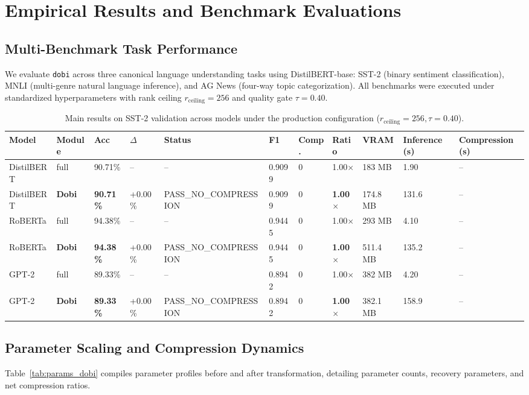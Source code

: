 \section{Empirical Results and Benchmark Evaluations}
\label{sec:results}

\subsection{Multi-Benchmark Task Performance}
We evaluate \texttt{dobi} across three canonical language understanding tasks using DistilBERT-base: SST-2 (binary sentiment classification), MNLI (multi-genre natural language inference), and AG News (four-way topic categorization). All benchmarks were executed under standardized hyperparameters with rank ceiling $r_{\mathrm{ceiling}} = 256$ and quality gate $\tau = 0.40$.

\begin{table}[t]
\centering
\small
\begin{tabular}{lllllllllll}
\toprule
\textbf{Model} & \textbf{Module} & \textbf{Acc} & \textbf{$\Delta$} & \textbf{Status} & \textbf{F1} & \textbf{Comp.} & \textbf{Ratio} & \textbf{VRAM} & \textbf{Inference (s)} & \textbf{Compression (s)} \\
\midrule
DistilBERT & full & 90.71\% & -- & -- & 0.9099 & 0 & 1.00$\times$ & 183 MB & 1.90 & -- \\
DistilBERT & \textbf{Dobi} & \textbf{90.71\%} & +0.00\% & PASS\_NO\_COMPRESSION & 0.9099 & 0 & \textbf{1.00$\times$} & 174.8 MB & 131.6 & -- \\
RoBERTa & full & 94.38\% & -- & -- & 0.9445 & 0 & 1.00$\times$ & 293 MB & 4.10 & -- \\
RoBERTa & \textbf{Dobi} & \textbf{94.38\%} & +0.00\% & PASS\_NO\_COMPRESSION & 0.9445 & 0 & \textbf{1.00$\times$} & 511.4 MB & 135.2 & -- \\
GPT-2 & full & 89.33\% & -- & -- & 0.8942 & 0 & 1.00$\times$ & 382 MB & 4.20 & -- \\
GPT-2 & \textbf{Dobi} & \textbf{89.33\%} & +0.00\% & PASS\_NO\_COMPRESSION & 0.8942 & 0 & \textbf{1.00$\times$} & 382.1 MB & 158.9 & -- \\
\bottomrule
\end{tabular}
\caption{Main results on SST-2 validation across models under the production configuration ($r_{\mathrm{ceiling}}=256, \tau=0.40$).}
\label{tab:main_sst2}
\end{table}

\subsection{Parameter Scaling and Compression Dynamics}
Table~\ref{tab:params_dobi} compiles parameter profiles before and after transformation, detailing parameter counts, recovery parameters, and net compression ratios.

